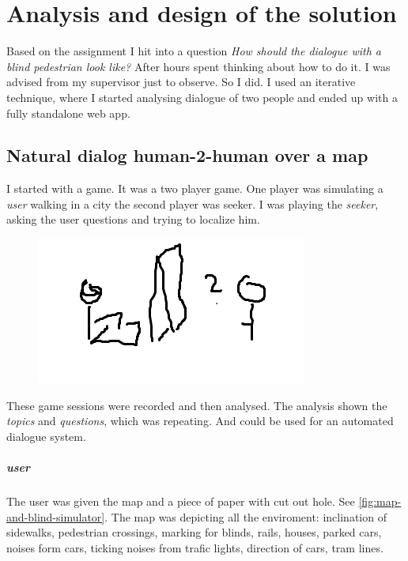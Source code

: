 	\chapter{Analysis and design of the solution}
	Based on the assignment I hit into a question \emph{How should the dialogue with a blind pedestrian look like?} After hours spent thinking about how to do it. I was advised from my supervisor just to observe. So I did. I used an iterative technique, where I started analysing dialogue of two people and ended up with a fully standalone web app.
	\section{Natural dialog human-2-human over a map}
	\label{sec:FirstExperiment}
	I started with a game. It was a two player game. One player was simulating a \emph{ user} walking in a city the second player was seeker. I was playing the \emph{seeker}, asking the user questions and trying to localize him.
	
	\begin{figure}[h]
		\centering
		\includegraphics[width=0.7\linewidth]{figures/1stExp-human2humanOverMap/bigpicture}
		\caption[Setup]{}
		\caption{}
		\label{fig:bigpicture}
	\end{figure}

	These game sessions were recorded and then analysed. The analysis shown the \emph{topics} and \emph{questions}, which was repeating. And could be used for an automated dialogue system.
	
	
	\paragraph{ user}
	The user was given the map and a piece of paper with cut out hole. See \ref{fig:map-and-blind-simulator}. The map was depicting all the enviroment: inclination of sidewalks, pedestrian crossings,  marking for blinds, rails, houses, parked cars, noises form cars, ticking noises from trafic lights, direction of cars, tram lines.
	
